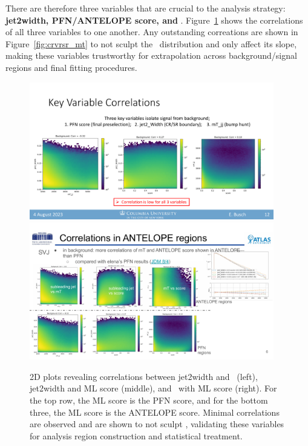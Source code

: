 There are therefore three variables that are crucial to the analysis strategy: \textbf{jet2width, PFN/ANTELOPE score, and \mt}.
Figure~\ref{fig:bkg_correlations} shows the correlations of all three variables to one another.
Any outstanding correations are shown in Figure~\ref{fig:crvrsr_mt} to not sculpt the \mt~distribution and only affect its slope, making these variables trustworthy for extrapolation across background/signal regions and final fitting procedures.
\begin{figure}[!htbp]
\centering
   \includegraphics[width=0.95\textwidth]{figures/background/bkg_correlations}
   \includegraphics[width=0.95\textwidth]{figures/background/bkg_correlations_antelope}
    \caption{2D plots revealing correlations between jet2width and \mt~(left), jet2width and ML score (middle), and \mt~with ML score (right). For the top row, the ML score is the PFN score, and for the bottom three, the ML score is the ANTELOPE score. Minimal correlations are observed and are shown to not sculpt \mt, validating these variables for analysis region construction and statistical treatment.
    \label{fig:bkg_correlations}}
\end{figure}

